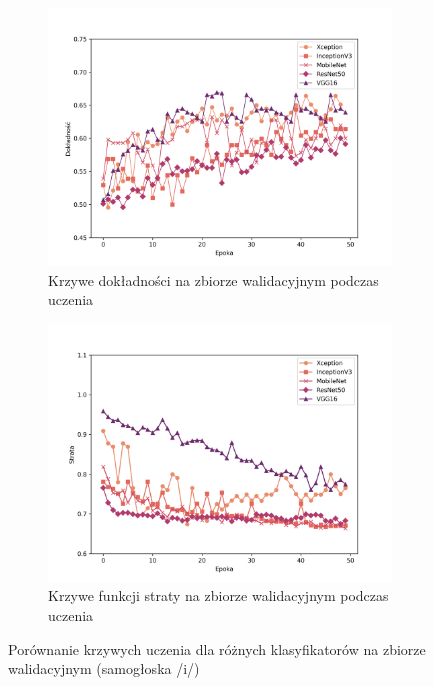 \begin{figure}[ht]
    \centering
    \begin{subfigure}{0.49\textwidth}
        \centering
        \includegraphics[width=\textwidth]{./img/results/i_acc}
        \caption{Krzywe dokładności na zbiorze walidacyjnym podczas uczenia\@}
        \label{fig:i_acc}
    \end{subfigure}
    \begin{subfigure}{0.49\textwidth}
        \centering
        \includegraphics[width=\textwidth]{./img/results/i_loss}
        \caption{Krzywe funkcji straty na zbiorze walidacyjnym podczas uczenia\@}
        \label{fig:i_loss}
    \end{subfigure}

    \caption{Porównanie krzywych uczenia dla różnych klasyfikatorów na zbiorze walidacyjnym (samogłoska /i/)}
    \label{fig:i_results}
\end{figure}

